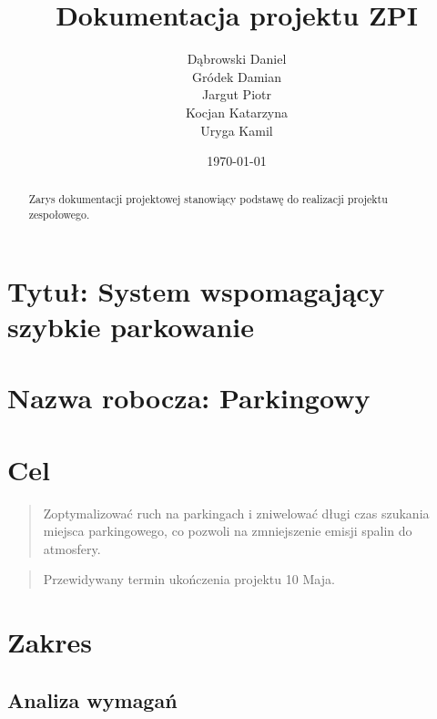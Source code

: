 \documentclass[12pt,a4paper]{article}
\begin{document}
\title{Dokumentacja projektu ZPI}
\author{Dąbrowski Daniel\\ Gródek Damian\\ Jargut Piotr\\ Kocjan Katarzyna\\ Uryga Kamil}
\date{\today}

\maketitle

\begin{abstract}
Zarys dokumentacji projektowej stanowiący podstawę do realizacji projektu \\ zespołowego. 
\end{abstract}



\newpage

\tableofcontents
\listoftables
\listoffigures



\newpage

\section{Tytuł: System wspomagający szybkie parkowanie}

\section{Nazwa robocza: Parkingowy}

\section{Cel}
\begin{quotation}
Zoptymalizować ruch na parkingach i zniwelować długi czas szukania miejsca parkingowego, co pozwoli na zmniejszenie emisji spalin do atmosfery.
\end{quotation}
\begin{quotation}
Przewidywany termin ukończenia projektu 10 Maja.
\end{quotation}

\section{Zakres}

\subsection{Analiza wymagań}
\end{document}
